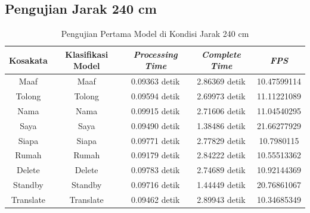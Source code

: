 \subsection{Pengujian Jarak 240 cm}
\label{sec:analisisjarak2}

\begin{longtable}{|c|c|c|c|c|}
  \caption{Pengujian Pertama Model di Kondisi Jarak 240 cm}
  \label{tb:prediksitengah1}                                   \\
  \hline
  \rowcolor[HTML]{C0C0C0}
  \textbf{Kosakata} & \textbf{Klasifikasi Model} & \textbf{\emph{Processing Time}} & \textbf{\emph{Complete Time}} & \textbf{\emph{FPS}}\\
  \hline
  Maaf              & Maaf                          & 0.09363 detik                           & 2.86369 detik                                  & 10.47599114\\
  Tolong            & Tolong                        & 0.09594 detik                           & 2.69973 detik                                  & 11.11221089\\
  Nama              & Nama                          & 0.09915 detik                           & 2.71606 detik                                  & 11.04540295\\
  Saya              & Saya                          & 0.09490 detik                           & 1.38486 detik                                  & 21.66277929\\
  Siapa             & Siapa                         & 0.09771 detik                           & 2.77829 detik                                  & 10.7980115\\
  Rumah             & Rumah                         & 0.09179 detik                           & 2.84222 detik                                  & 10.55513362\\
  Delete            & Delete                        & 0.09783 detik                           & 2.74689 detik                                  & 10.92144369\\
  Standby           & Standby                       & 0.09716 detik                           & 1.44449 detik                                  & 20.76861067\\
  Translate         & Translate                     & 0.09462 detik                           & 2.89943 detik                                  & 10.34685349\\
  \hline
\end{longtable}


